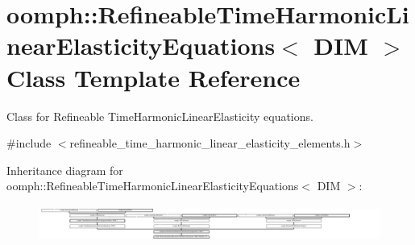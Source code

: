 \hypertarget{classoomph_1_1RefineableTimeHarmonicLinearElasticityEquations}{}\section{oomph\+:\+:Refineable\+Time\+Harmonic\+Linear\+Elasticity\+Equations$<$ D\+IM $>$ Class Template Reference}
\label{classoomph_1_1RefineableTimeHarmonicLinearElasticityEquations}


Class for Refineable Time\+Harmonic\+Linear\+Elasticity equations.  




{\ttfamily \#include $<$refineable\+\_\+time\+\_\+harmonic\+\_\+linear\+\_\+elasticity\+\_\+elements.\+h$>$}

Inheritance diagram for oomph\+:\+:Refineable\+Time\+Harmonic\+Linear\+Elasticity\+Equations$<$ D\+IM $>$\+:\begin{figure}[H]
\begin{center}
\leavevmode
\includegraphics[height=1.199143cm]{classoomph_1_1RefineableTimeHarmonicLinearElasticityEquations}
\end{center}
\end{figure}
